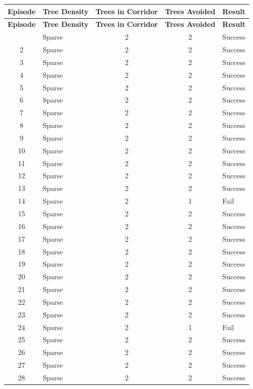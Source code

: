 \documentclass[../main.tex]{subfiles}
\begin{document}
\begin{center}
\small
\begin{longtable}{|c|l|c|c|l|}
\hline
\textbf{Episode} & \textbf{Tree Density} & \textbf{Trees in Corridor} & \textbf{Trees Avoided} & \textbf{Result} \\
\hline
\endfirsthead
\hline
\textbf{Episode} & \textbf{Tree Density} & \textbf{Trees in Corridor} & \textbf{Trees Avoided} & \textbf{Result} \\
\hline
\endhead
\hline
\endfoot
    1 & Sparse & 2 & 2 & Success \\
    2 & Sparse & 2 & 2 & Success \\
    3 & Sparse & 2 & 2 & Success \\
    4 & Sparse & 2 & 2 & Success \\
    5 & Sparse & 2 & 2 & Success \\
    6 & Sparse & 2 & 2 & Success \\
    7 & Sparse & 2 & 2 & Success \\
    8 & Sparse & 2 & 2 & Success \\
    9 & Sparse & 2 & 2 & Success \\
    10 & Sparse & 2 & 2 & Success \\
    11 & Sparse & 2 & 2 & Success \\
    12 & Sparse & 2 & 2 & Success \\
    13 & Sparse & 2 & 2 & Success \\
    14 & Sparse & 2 & 1 & Fail \\
    15 & Sparse & 2 & 2 & Success \\
    16 & Sparse & 2 & 2 & Success \\
    17 & Sparse & 2 & 2 & Success \\
    18 & Sparse & 2 & 2 & Success \\
    19 & Sparse & 2 & 2 & Success \\
    20 & Sparse & 2 & 2 & Success \\
    21 & Sparse & 2 & 2 & Success \\
    22 & Sparse & 2 & 2 & Success \\
    23 & Sparse & 2 & 2 & Success \\
    24 & Sparse & 2 & 1 & Fail \\
    25 & Sparse & 2 & 2 & Success \\
    26 & Sparse & 2 & 2 & Success \\
    27 & Sparse & 2 & 2 & Success \\
    28 & Sparse & 2 & 2 & Success \\

\end{longtable}
\end{center}
\end{document}
